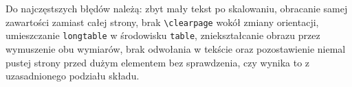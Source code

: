 Do najczęstszych błędów należą: zbyt mały tekst po skalowaniu, obracanie samej zawartości zamiast całej strony, brak \verb|\clearpage| wokół zmiany orientacji, umieszczanie \texttt{longtable} w środowisku \texttt{table}, zniekształcanie obrazu przez wymuszenie obu wymiarów, brak odwołania w tekście oraz pozostawienie niemal pustej strony przed dużym elementem bez sprawdzenia, czy wynika to z uzasadnionego podziału składu.
